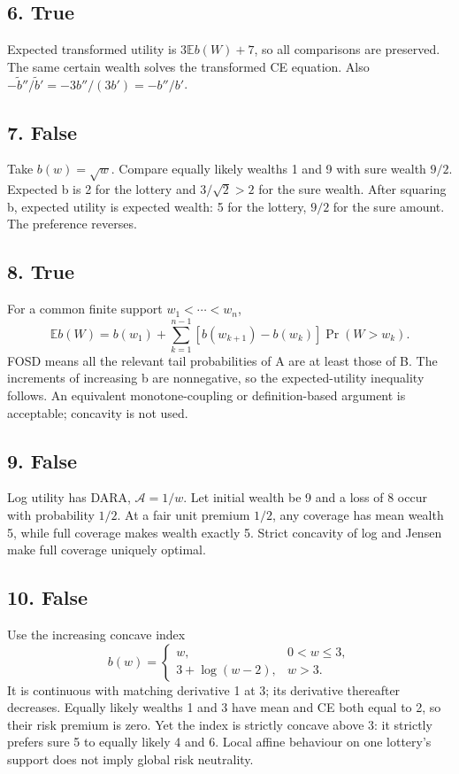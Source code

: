\subsection*{6. True}
Expected transformed utility is $3\mathbb E b(W)+7$, so all comparisons
are preserved. The same certain wealth solves the transformed CE equation.
Also $-\widetilde b''/\widetilde b'=-3b''/(3b')=-b''/b'$.

\subsection*{7. False}
Take $b(w)=\sqrt w$. Compare equally likely wealths 1 and 9 with sure
wealth $9/2$. Expected b is 2 for the lottery and $3/\sqrt2>2$ for the
sure wealth. After squaring b, expected utility is expected wealth: 5 for
the lottery, $9/2$ for the sure amount. The preference reverses.

\subsection*{8. True}
For a common finite support $w_1<\cdots<w_n$,
\[
 \mathbb E b(W)=b(w_1)+\sum_{k=1}^{n-1}
 [b(w_{k+1})-b(w_k)]\Pr(W>w_k).
\]
FOSD means all the relevant tail probabilities of A are at least those of B.
The increments of increasing b are nonnegative, so the expected-utility
inequality follows. An equivalent monotone-coupling or definition-based
argument is acceptable; concavity is not used.

\subsection*{9. False}
Log utility has DARA, $\mathcal A=1/w$. Let initial wealth be 9 and a loss
of 8 occur with probability $1/2$. At a fair unit premium $1/2$, any
coverage has mean wealth 5, while full coverage makes wealth exactly 5.
Strict concavity of log and Jensen make full coverage uniquely optimal.

\subsection*{10. False}
Use the increasing concave index
\[
 b(w)=\begin{cases}w,&0<w\le3,\\3+\log(w-2),&w>3.\end{cases}
\]
It is continuous with matching derivative 1 at 3; its derivative thereafter
decreases. Equally likely wealths 1 and 3 have mean and CE both equal to 2,
so their risk premium is zero. Yet the index is strictly concave above 3:
it strictly prefers sure 5 to equally likely 4 and 6. Local affine behaviour
on one lottery's support does not imply global risk neutrality.
